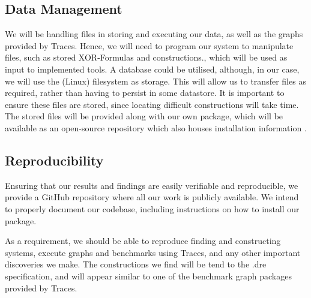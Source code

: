 \subsection{Data Management}
We will be handling files in storing and executing our data, as well as the graphs provided by Traces. Hence, we will need to program our system to manipulate files, such as stored XOR-Formulas and constructions., which will be used as input to implemented tools. A database could be utilised, although, in our case, we will use the (Linux) filesystem as storage. This will allow us to transfer files as required, rather than having to persist in some datastore. It is important to ensure these files are stored, since locating difficult constructions will take time. The stored files will be provided along with our own package, which will be available as an open-source repository which also houses installation information \cite{quasipolynomial}.

\subsection{Reproducibility}
Ensuring that our results and findings are easily verifiable and reproducible, we provide a GitHub repository where all our work is publicly available. We intend to properly document our codebase, including instructions on how to install our package.
\par
As a requirement, we should be able to reproduce finding and constructing systems, execute graphs and benchmarks using Traces, and any other important discoveries we make. The constructions we find will be tend to the .dre specification, and will appear similar to one of the benchmark graph packages provided by Traces.

